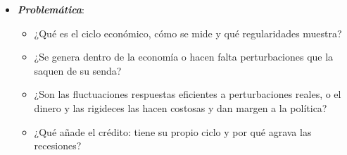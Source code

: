 \documentclass[11pt]{article}
\begin{document}
\begin{itemize}
\begin{itemize}
\begin{itemize}
\begin{itemize}
      \item \emph{Dinámico}: hogares y empresas miran hacia delante y deciden a lo largo del tiempo.
      \item \emph{Estocástico}: hay perturbaciones aleatorias (\emph{shocks}) que mueven la economía.
      \end{itemize}
    \item por el \emph{papel del dinero}: en los  las fluctuaciones son la respuesta eficiente a perturbaciones reales (la productividad, las preferencias) y el dinero es neutral; en los  las perturbaciones monetarias tienen efectos reales, porque la información es imperfecta (, 1972)\footnote{ recibió el Premio Nobel de Economía en 1995 «por haber desarrollado y aplicado la hipótesis de las expectativas racionales, transformando así el análisis macroeconómico y profundizando en la comprensión de la política económica»\nocite{NobelPrize1995Lucas}.} o porque los precios y los salarios son rígidos (la nueva economía keynesiana), y las variables nominales propagan cualquier perturbación.
    \end{itemize}
  \item El  añade un tercer plano: el crédito y los precios de los activos, sobre todo de la vivienda, tienen su propio ciclo, más largo que el real, y lo amplifican\nocite{Borio2014Financial}.
  \end{itemize}

\item \textbf{\emph{Problemática}}:
  \begin{itemize}
  \item ¿Qué es el ciclo económico, cómo se mide y qué regularidades muestra?
  \item ¿Se genera dentro de la economía o hacen falta perturbaciones que la saquen de su senda?
  \item ¿Son las fluctuaciones respuestas eficientes a perturbaciones reales, o el dinero y las rigideces las hacen costosas y dan margen a la política?
  \item ¿Qué añade el crédito: tiene su propio ciclo y por qué agrava las recesiones?
  \end{itemize}


\end{itemize}
\end{document}
